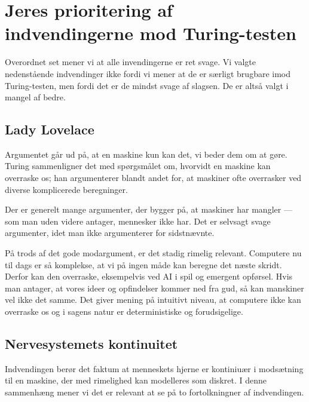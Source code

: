 \documentclass{article}
\begin{document}

\section{Jeres prioritering af indvendingerne mod Turing-testen}
Overordnet set mener vi at alle invendingerne er ret svage. Vi valgte nedenstående indvendinger ikke fordi vi mener at de er særligt brugbare imod Turing-testen, men fordi det er de mindst svage af slagsen. De er altså valgt i mangel af bedre. %
\subsection{Lady Lovelace}
Argumentet går ud på, at en maskine kun kan det, vi beder dem om at gøre. Turing sammenligner det med spørgsmålet om, hvorvidt en maskine kan overraske os; han argumenterer blandt andet for, at maskiner ofte overrasker ved diverse komplicerede beregninger.

Der er generelt mange argumenter, der bygger på, at maskiner har mangler --- som man uden videre antager, mennesker ikke har. Det er selvsagt svage argumenter, idet man ikke argumenterer for sidstnævnte.

På trods af det gode modargument, er det stadig rimelig relevant. Computere nu til dags er så komplekse, at vi på ingen måde kan beregne det næste skridt. Derfor kan den overraske, eksempelvis ved AI i spil og emergent opførsel. Hvis man antager, at vores ideer og opfindelser kommer ned fra gud, så kan manskiner vel ikke det samme. Det giver mening på intuitivt niveau, at computere ikke kan overraske os og i sagens natur er deterministiske og forudsigelige.

\subsection{Nervesystemets kontinuitet}

Indvendingen berør det faktum at menneskets hjerne er kontiniuær i modsætning til en maskine, der med rimelighed kan modelleres som diskret. I denne sammenhæng mener vi det er relevant at se på to fortolkningner af indvendingen.
\end{document}
